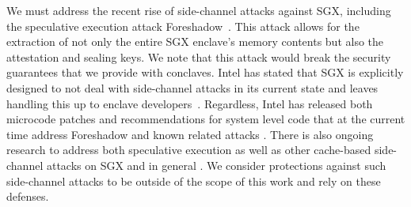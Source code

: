 %
We must address the recent rise
 of side-channel attacks against SGX, including
the speculative execution attack Foreshadow~\cite{foreshadow,
weisse2018foreshadow}.  This attack allows for the extraction of not only the
entire SGX enclave's memory contents but also the attestation and sealing keys.
We note that this attack would break the security guarantees that we provide
with conclaves.
%
Intel has stated that SGX is explicitly designed to not deal
with side-channel attacks in its current state and leaves handling this up to
enclave developers~\cite{sgx-sidechannel, sgx-developers}.
%
Regardless, Intel
has released both microcode patches and recommendations for system level code
that at the current time address Foreshadow and known related attacks
\cite{sgx-patch, canella2018systematic, weisse2018foreshadow}.  There is also
ongoing research to address both speculative execution
as well as other cache-based side-channel attacks on SGX and in general
\cite{yan2018invisispec, oleksenko2018varys, canella2018systematic, shih2017t}.
%
We consider protections against such side-channel attacks to be outside of the
scope of this work and rely on these defenses.
%



